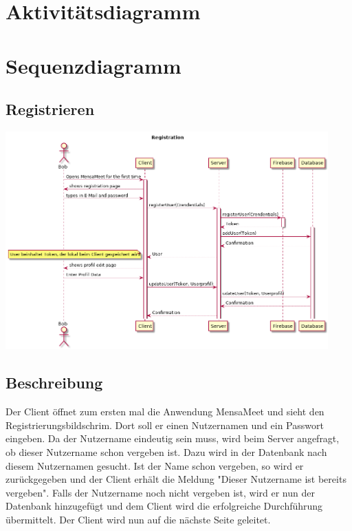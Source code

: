 \documentclass[a4paper]{scrreprt}
\begin{document}
\section{Aktivitätsdiagramm}

\section{Sequenzdiagramm}
\subsection{Registrieren}
\begin{center}
	\includegraphics[width=0.93\textwidth]{Sequenzdiagramme/Registration.png}
\end{center}
\subsection*{Beschreibung}
Der Client öffnet zum ersten mal die Anwendung MensaMeet und sieht den Registrierungsbildschrim. Dort soll er einen Nutzernamen und ein Passwort eingeben. Da der Nutzername eindeutig sein muss, wird beim Server angefragt, ob dieser Nutzername schon vergeben ist. Dazu wird in der Datenbank nach diesem Nutzernamen gesucht. Ist der Name schon vergeben, so wird er zurückgegeben und der Client erhält die Meldung "Dieser Nutzername ist bereits vergeben".
Falls der Nutzername noch nicht vergeben ist, wird er nun der Datenbank hinzugefügt und dem Client wird die erfolgreiche Durchführung übermittelt. Der Client wird nun auf die nächste Seite geleitet.
\newpage
\end{document}
